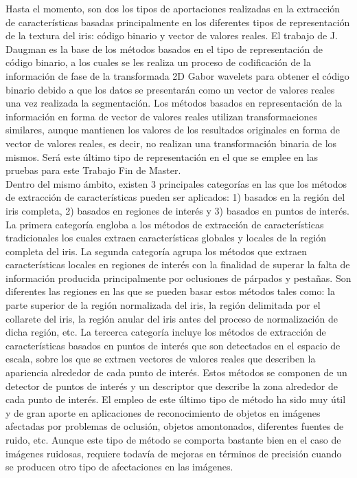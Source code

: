 Hasta el momento, son dos los tipos de aportaciones realizadas en la extracción de características basadas principalmente en los diferentes tipos de representación de la textura del iris: código binario y vector de valores reales. El trabajo de J. Daugman \cite{Reference15} es la base de los métodos basados en el tipo de representación de código binario, a los cuales se les realiza un proceso de codificación de la información de fase de la transformada 2D Gabor wavelets para obtener el código binario debido a que los datos se presentarán como un vector de valores reales una vez realizada la segmentación. Los métodos basados en representación de la información en forma de vector de valores reales utilizan transformaciones similares, aunque mantienen los valores de los resultados originales en forma de vector de valores reales, es decir, no realizan una transformación binaria de los mismos. Será este último tipo de representación en el que se emplee en las pruebas para este Trabajo Fin de Master. \\

Dentro del mismo ámbito, existen 3 principales categorías en las que los métodos de extracción de características pueden ser aplicados: 1) basados en la región del iris completa, 2) basados en regiones de interés y 3) basados en puntos de interés. La primera categoría engloba a los métodos de extracción de características tradicionales los cuales extraen características globales y locales de la región completa del iris. La segunda categoría agrupa los métodos que extraen características locales en regiones de interés con la finalidad de superar la falta de información producida principalmente por oclusiones de párpados y pestañas. Son diferentes las regiones en las que se pueden basar estos métodos tales como: la parte superior de la región normalizada del iris, la región delimitada por el collarete del iris, la región anular del iris antes del proceso de normalización de dicha región, etc. La tercerca categoría incluye los métodos de extracción de características basados en puntos de interés que son detectados en el espacio de escala, sobre los que se extraen vectores de valores reales que describen la apariencia alrededor de cada punto de interés. Estos métodos se componen de un detector de puntos de interés y un descriptor que describe la zona alrededor de cada punto de interés. El empleo de este último tipo de método ha sido muy útil y de gran aporte en aplicaciones de reconocimiento de objetos en imágenes afectadas por problemas de oclusión, objetos amontonados, diferentes fuentes de ruido, etc. Aunque este tipo de método se comporta bastante bien en el caso de imágenes ruidosas, requiere todavía de mejoras en términos de precisión cuando se producen otro tipo de afectaciones en las imágenes. \\ 

